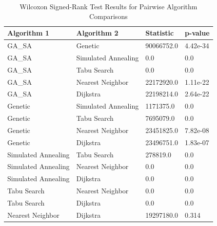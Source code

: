 \documentclass[
]{article}
\begin{document}
    \begin{table}[h!]
        \centering
        \caption{Wilcoxon Signed-Rank Test Results for Pairwise Algorithm Comparisons}
        \label{tab:wilcoxon_results}
        \begin{tabularx}{\textwidth}{|l|l|X|X|}
            \hline
            \textbf{Algorithm 1} & \textbf{Algorithm 2} & \textbf{Statistic} & \textbf{p-value} \\
            \hline
            GA\_SA               & Genetic              & 90066752.0         & 4.42e-34         \\
            GA\_SA               & Simulated Annealing  & 0.0                & 0.0              \\
            GA\_SA               & Tabu Search          & 0.0                & 0.0              \\
            GA\_SA               & Nearest Neighbor     & 22172920.0         & 1.11e-22         \\
            GA\_SA               & Dijkstra             & 22198214.0         & 2.64e-22         \\
            Genetic              & Simulated Annealing  & 1171375.0          & 0.0              \\
            Genetic              & Tabu Search          & 7695079.0          & 0.0              \\
            Genetic              & Nearest Neighbor     & 23451825.0         & 7.82e-08         \\
            Genetic              & Dijkstra             & 23496751.0         & 1.83e-07         \\
            Simulated Annealing  & Tabu Search          & 278819.0           & 0.0              \\
            Simulated Annealing  & Nearest Neighbor     & 0.0                & 0.0              \\
            Simulated Annealing  & Dijkstra             & 0.0                & 0.0              \\
            Tabu Search          & Nearest Neighbor     & 0.0                & 0.0              \\
            Tabu Search          & Dijkstra             & 0.0                & 0.0              \\
            Nearest Neighbor     & Dijkstra             & 19297180.0         & 0.314            \\
            \hline
        \end{tabularx}
    \end{table}
    \newpage
\end{document}
